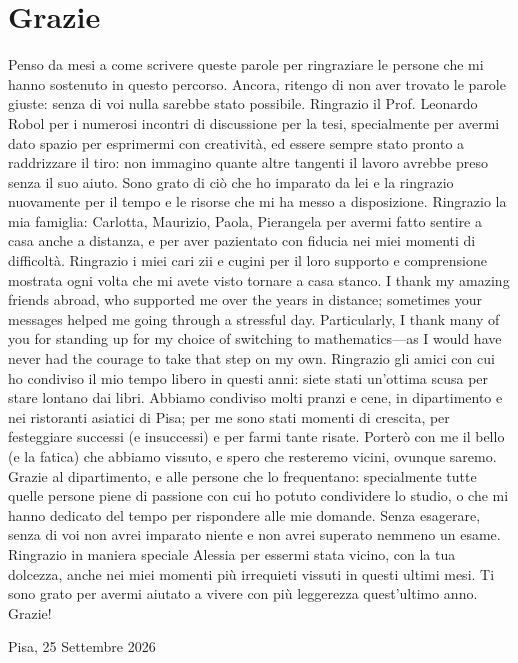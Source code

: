 \chapter*{Grazie}

Penso da mesi a come scrivere queste parole per ringraziare le persone che mi
hanno sostenuto in questo percorso. Ancora, ritengo di non aver trovato le parole giuste: senza di voi nulla sarebbe stato possibile.
Ringrazio il Prof. Leonardo Robol per i numerosi incontri di discussione per la tesi, specialmente per
avermi dato spazio per esprimermi con creatività, ed essere sempre stato pronto a raddrizzare il
tiro: non immagino quante altre tangenti il lavoro avrebbe preso senza il suo aiuto. Sono grato di ciò che ho imparato
da lei e la ringrazio nuovamente per il tempo e le risorse che mi ha messo a disposizione.
Ringrazio la mia famiglia: Carlotta, Maurizio, Paola, Pierangela per avermi fatto sentire
a casa anche a distanza, e per aver pazientato con fiducia nei miei momenti di difficoltà. Ringrazio i miei
cari zii e cugini per il loro supporto e comprensione mostrata ogni volta che mi avete visto tornare a casa stanco.
I thank my amazing friends abroad, who supported
me over the years in distance; sometimes your messages helped me going through a stressful day.
Particularly, I thank many of you for standing up for my choice of
switching to mathematics---as I would have never had the courage to take that step on my own.
Ringrazio gli amici con cui ho condiviso il mio tempo libero in questi anni: siete stati
un'ottima scusa per stare lontano dai libri.
Abbiamo condiviso molti pranzi e
cene, in dipartimento e nei ristoranti asiatici di Pisa; per me sono stati
momenti di crescita, per festeggiare successi (e insuccessi) e per farmi tante risate. Porterò con me il bello (e la fatica) che abbiamo
vissuto, e spero che resteremo vicini, ovunque saremo. Grazie
al dipartimento, e alle persone che lo frequentano: specialmente tutte quelle
persone piene di passione con cui ho potuto condividere lo studio, o che mi hanno dedicato del
tempo per rispondere alle mie domande. Senza esagerare, senza di voi non avrei imparato niente e non avrei superato
nemmeno un esame.
Ringrazio in maniera speciale Alessia per essermi stata vicino, con la tua dolcezza,
anche nei miei momenti più irrequieti vissuti in questi ultimi mesi. Ti sono grato per
avermi aiutato a vivere con più leggerezza quest'ultimo anno. Grazie!

\begin{flushright}
	Pisa, 25 Settembre 2026 %
\end{flushright}

